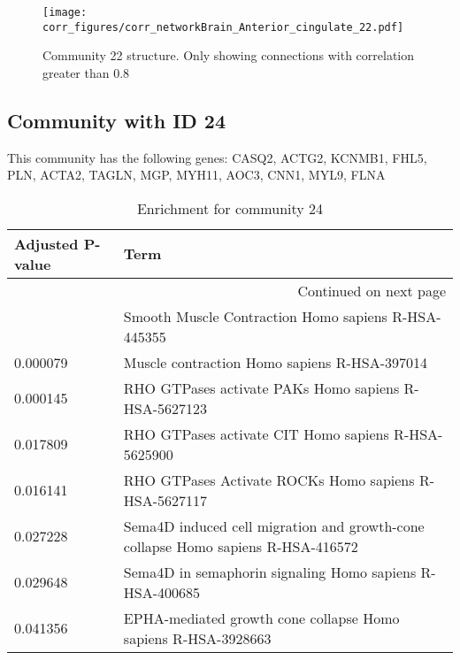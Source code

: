 \begin{figure}[h!]
\centering
\texttt{[image: corr\_figures/corr\_networkBrain\_Anterior\_cingulate\_22.pdf]}
\caption{Community 22 structure. Only showing connections with correlation greater than 0.8}
\end{figure}




\subsection*{Community with ID 24}
This community has the following genes: CASQ2, ACTG2, KCNMB1, FHL5, PLN, ACTA2, TAGLN, MGP, MYH11, AOC3, CNN1, MYL9, FLNA
\\
\begin{longtable}{p{2.4cm}p{14.5cm}}
\caption{Enrichment for community 24}\\
\toprule
Adjusted \newline P-value &                                                                              Term \\
\midrule
\endhead
\midrule
\multicolumn{2}{r}{{Continued on next page}} \\
\midrule
\endfoot

\bottomrule
\endlastfoot
                 0.000007 &                               Smooth Muscle Contraction Homo sapiens R-HSA-445355 \\
                 0.000079 &                                      Muscle contraction Homo sapiens R-HSA-397014 \\
                 0.000145 &                              RHO GTPases activate PAKs Homo sapiens R-HSA-5627123 \\
                 0.017809 &                               RHO GTPases activate CIT Homo sapiens R-HSA-5625900 \\
                 0.016141 &                             RHO GTPases Activate ROCKs Homo sapiens R-HSA-5627117 \\
                 0.027228 &  Sema4D induced cell migration and growth-cone collapse Homo sapiens R-HSA-416572 \\
                 0.029648 &                          Sema4D in semaphorin signaling Homo sapiens R-HSA-400685 \\
                 0.041356 &                     EPHA-mediated growth cone collapse Homo sapiens R-HSA-3928663 \\
\end{longtable}



